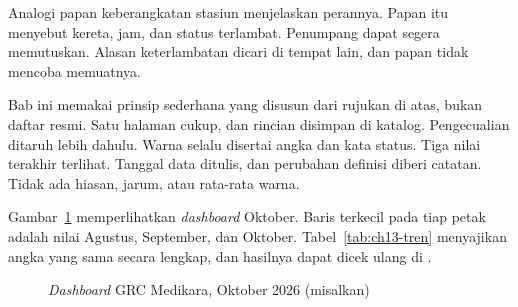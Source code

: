 Analogi papan keberangkatan stasiun menjelaskan perannya. Papan itu menyebut kereta, jam, dan status
terlambat. Penumpang dapat segera memutuskan. Alasan keterlambatan dicari di tempat lain, dan papan
tidak mencoba memuatnya.

Bab ini memakai prinsip sederhana yang disusun dari rujukan di atas, bukan daftar resmi. Satu
halaman cukup, dan rincian disimpan di katalog. Pengecualian ditaruh lebih dahulu. Warna selalu
disertai angka dan kata status. Tiga nilai terakhir terlihat. Tanggal data ditulis, dan perubahan
definisi diberi catatan. Tidak ada hiasan, jarum, atau rata-rata warna.

Gambar~\ref{fig:ch13-dashboard} memperlihatkan \textit{dashboard} Oktober. Baris terkecil pada tiap
petak adalah nilai Agustus, September, dan Oktober. Tabel~\ref{tab:ch13-tren} menyajikan angka yang
sama secara lengkap, dan hasilnya dapat dicek ulang di
.

\begin{figure}[!htb]
  \centering
  
  \caption{\textit{Dashboard} GRC Medikara, Oktober 2026 (misalkan)}
  \label{fig:ch13-dashboard}
\end{figure}

